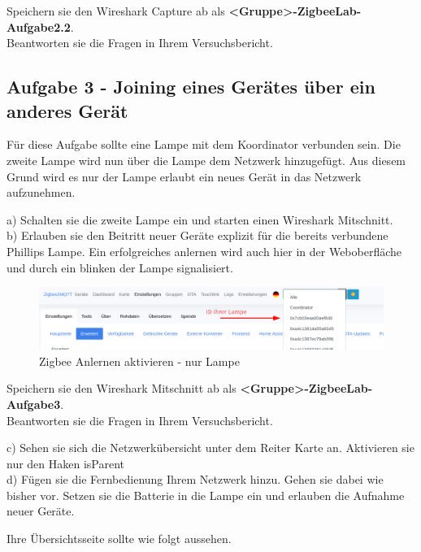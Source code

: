 \begin{Aufgabe}
    Speichern sie den Wireshark Capture ab als \textbf{\grqq <Gruppe>-ZigbeeLab-Aufgabe2.2\grqq{}}. \\
    Beantworten sie die Fragen in Ihrem Versuchsbericht.
\end{Aufgabe}

\subsection{Aufgabe 3 - Joining eines Gerätes über ein anderes Gerät}
Für diese Aufgabe sollte eine Lampe mit dem Koordinator verbunden sein. Die zweite Lampe wird nun über die Lampe dem Netzwerk hinzugefügt. Aus diesem Grund wird es nur der Lampe
erlaubt ein neues Gerät in das Netzwerk aufzunehmen. 

a) Schalten sie die zweite Lampe ein und starten einen Wireshark Mitschnitt.\\
b) Erlauben sie den Beitritt neuer Geräte explizit für die bereits verbundene Phillips Lampe.
Ein erfolgreiches anlernen wird auch hier in der Weboberfläche und durch ein blinken der Lampe signalisiert. 

\begin{figure}[H]
    \centering
    \includegraphics[width=1\textwidth]{media/Z2M-Anlernen-Lampe.png}
    \caption{Zigbee Anlernen aktivieren - nur Lampe}
\end{figure}

\begin{Aufgabe}
    Speichern sie den Wireshark Mitschnitt ab als \textbf{\grqq <Gruppe>-ZigbeeLab-Aufgabe3\grqq{}}. \\
    Beantworten sie die Fragen in Ihrem Versuchsbericht.
\end{Aufgabe}

c) Sehen sie sich die Netzwerkübersicht unter dem Reiter \grqq Karte\grqq{} an. Aktivieren sie nur den Haken \grqq isParent\grqq{} \\
d) Fügen sie die Fernbedienung Ihrem Netzwerk hinzu. Gehen sie dabei wie bisher vor. Setzen sie die Batterie in die Lampe ein und erlauben die Aufnahme neuer Geräte.

Ihre Übersichtsseite sollte wie folgt aussehen.

